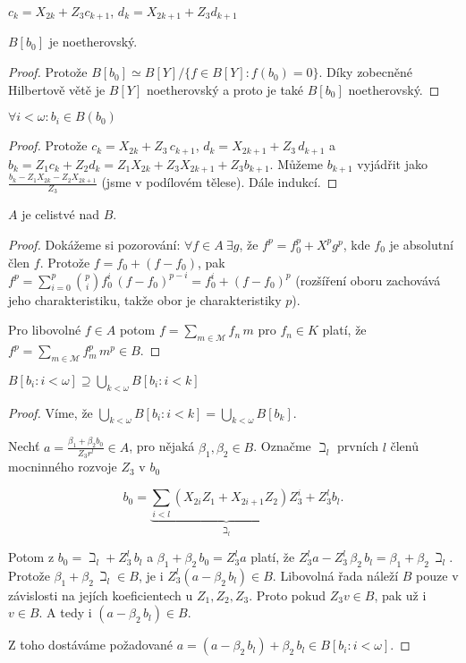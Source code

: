\documentclass[11pt,a4paper]{article}
\newcommand\p[1]{\mathcal{ #1 }} %
\theoremstyle{definition}
\theoremstyle{plain}
\begin{document}
\pozorovani $c_k = X_{2k} + Z_3 c_{k+1}$, $d_k = X_{2k+1} + Z_3 d_{k+1}$

\veta $B[b_0]$ je noetherovský.
\begin{proof}
	 Protože $B[b_0] \simeq B[Y] / \{ f \in B[Y] : f(b_0) = 0 \}$. Díky
	 zobecněné Hilbertově větě je $B[Y]$ noetherovský a proto je také $B[b_0]$
	 noetherovský.
\end{proof}

\lemma $\forall i < \omega\colon b_i \in B(b_0)$
\begin{proof}
	Protože $c_k = X_{2k} + Z_3\,c_{k+1}$, $d_k = X_{2k+1} + Z_3\,d_{k+1}$ a $b_k
	= Z_1 c_k + Z_2 d_k = Z_1 X_{2k} + Z_3 X_{2k + 1} + Z_3 b_{k + 1}$. Můžeme
	$b_{k+1}$ vyjádřit jako $\frac{b_k - Z_1 X_{2k} - Z_2 X_{2k+1}}{Z_3}$ (jsme
	v podílovém tělese). Dále indukcí.
\end{proof}

\lemma\label{celistvostA} $A$ je celistvé nad $B$.
\begin{proof}
	Dokážeme si pozorování: $\forall f \in A~\exists g$, že $f^p = f^p_0 + X^p
	g^p$, kde $f_0$ je absolutní člen $f$. Protože $f = f_0 + (f - f_0)$, pak
	$f^p = \sum_{i = 0}^p {p\choose i} f^i_0\,(f-f_0)^{p-i} = f^i_0 + (f-f_0)^p$
	(rozšíření oboru zachovává jeho charakteristiku, takže obor je
	charakteristiky $p$).

	Pro libovolné $f \in A$ potom $f = \sum_{m \in \p M} f_n\,m$ pro $f_n \in
	K$ platí, že $f^p = \sum_{m\in\p M} f^p_m\,m^p \in B$.
\end{proof}

\lemma[VII.7, jen strana nepožadující ($p=2$)] $B[b_i : i < \omega] \supseteq
\bigcup_{k < \omega} B[b_i : i < k]$
\begin{proof}
	Víme, že $\bigcup_{k < \omega} B[b_i : i < k] = \bigcup_{k < \omega}
	B[b_k]$.

	Nechť $a = \frac{\beta_1 + \beta_2 b_0}{Z_3r^l} \in A$, pro nějaká
	$\beta_1, \beta_2 \in B$. Označme $\beth_l$ prvních $l$ členů mocninného
	rozvoje $Z_3$ v $b_0$
	
	\[ b_0 = \underbrace{\sum_{i < l} (X_{2i} Z_1 + X_{2i+1} Z_2)
	Z_3^i}_{\beth_l} + Z_3^l b_l. \]

	Potom z $b_0 = \beth_l + Z_3^l\,b_l$ a $\beta_1 + \beta_2\,b_0 = Z_3^l a$
	platí, že $Z_3^l a - Z_3^l\,\beta_2\,b_l = \beta_1 + \beta_2\,\beth_l$.
	Protože $\beta_1 + \beta_2\,\beth_l \in B$, je i $Z_3^l (a - \beta_2\,b_l)
	\in B$. Libovolná řada náleží $B$ pouze v závislosti na jejích
	koeficientech u $Z_1, Z_2, Z_3$. Proto pokud $Z_3 v \in B$, pak už i $v \in
	B$. A tedy i $(a - \beta_2\,b_l) \in B$.

	Z toho dostáváme požadované $a = (a - \beta_2\,b_l) + \beta_2\,b_l \in B[b_i
	: i < \omega]$.
\end{proof}
\end{document}
